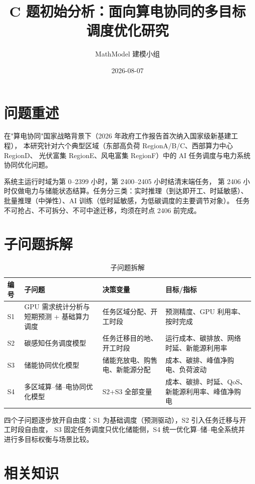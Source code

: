 \documentclass{internal-report}
\title{C 题初始分析：面向算电协同的多目标调度优化研究}
\author{MathModel 建模小组}
\date{2026-08-07}
\begin{document}
\maketitle

\section{问题重述}

在"算电协同"国家战略背景下（2026 年政府工作报告首次纳入国家级新基建工程），
本研究针对六个典型区域（东部高负荷 RegionA/B/C、西部算力中心 RegionD、
光伏富集 RegionE、风电富集 RegionF）中的 AI 任务调度与电力系统协同优化问题。

系统主运行时域为第 0--2399 小时，第 2400--2405 小时结清末端任务，
第 2406 小时仅做电力与储能状态结算。任务分三类：实时推理（到达即开工、时延敏感）、
批量推理（中弹性）、AI 训练（低时延敏感，为低碳调度的主要调节对象）。
任务不可抢占、不可拆分、不可中途迁移，均须在时点 2406 前完成。

\section{子问题拆解}

\begin{table}[h]
\centering
\footnotesize
\begin{tabular}{p{0.7cm}p{3.4cm}p{3.4cm}p{4.4cm}}
\toprule
编号 & 子问题 & 决策变量 & 目标/指标 \\
\midrule
S1 & GPU 需求统计分析与短期预测 + 基础算力调度 &
  任务区域分配、开工时段 & 预测精度、GPU 利用率、按时完成 \\
S2 & 碳感知任务调度模型 &
  任务迁移目的地、开工时段 & 运行成本、碳排放、网络时延、新能源利用率 \\
S3 & 储能协同优化模型 &
  储能充放电、购售电、新能源分配 & 成本、碳排、峰值净购电、负荷波动 \\
S4 & 多区域算--储--电协同优化模型 &
  S2+S3 全部变量 & 成本、碳排、时延、QoS、新能源利用率、峰值净购电 \\
\bottomrule
\end{tabular}
\caption{子问题拆解}
\label{tab:subproblems}
\end{table}

四个子问题逐步放开自由度：S1 为基础调度（预测驱动），S2 引入任务迁移与开工时段自由度，
S3 固定任务调度只优化储能侧，S4 统一优化算--储--电全系统并进行多目标权衡与场景比较。

\section{相关知识}
\end{document}
